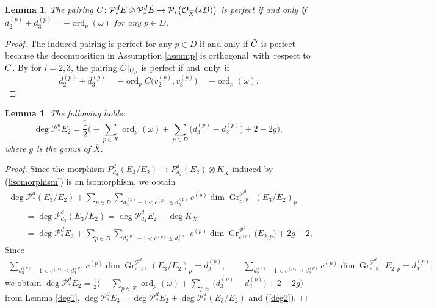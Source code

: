 \documentclass[pdftex]{sigma}
\numberwithin{equation}{section}
\newtheorem{Lemma}[Theorem]{Lemma}
\newcommand{\ord}{\operatorname{ord}}
\newcommand{\gr}{\operatorname{\mathrm{Gr}}}
\begin{document}
\begin{Lemma}\label{perfect}
 The pairing $\Tilde{C}\colon \mathcal{P}^d_* \Tilde{E}\otimes \mathcal{P}^d_* \Tilde{E}\to \mathcal{P}_*\bigl(\mathcal{O}_{\overline{X}}(*D)\bigr)$ is perfect if and only if $d^{(p)}_2 + d^{(p)}_3 = -\ord_p(\omega)$ for any $p\in D$.
\end{Lemma}
\begin{proof}
 The induced pairing  is perfect for any ${p\in D}$ if and only if $\Tilde{C}$ is perfect because the decomposition in Assumption \ref{assump} is orthogonal~with~respect to $\Tilde{C}$. By  for $i=2,3$, the pairing $\Tilde{C}|_{U_p}$ is perfect if and~only~if%
\begin{equation*}
 d^{(p)}_2 + d^{(p)}_3 = -\ord_p C\bigl(v^{(p)}_2,v^{(p)}_3\bigr) = -\ord_p(\omega).\tag*{\qed}
 \end{equation*}
 \renewcommand{\qed}{}
\end{proof}

\begin{Lemma}\label{deg_E2}
 The following holds:
 \begin{equation*}
 \deg{\mathcal{P}^d_{*}E_2} = \frac{1}{2}\biggl(-\sum_{p\in X}\ord_p(\omega) + \sum_{p\in D} \bigl(d^{(p)}_3 - d^{(p)}_2\bigr) + 2-2g\biggr),
 \end{equation*}
where $g$ is the genus of $\overline{X}$.
\end{Lemma}
\begin{proof}
 Since the morphism ${P}^d_{d_3}(E_3/E_2)\to {P}^d_{d_2}(E_2)\otimes K_{\overline{X}}$ induced by (\ref{isomorphism}) is an isomorphism, we obtain
\begin{gather}
 \deg{\mathcal{P}^d_{*}(E_3/E_2)} + \sum_{p\in D}\sum_{d^{(p)}_{3}-1< c^{(p)}\leq d^{(p)}_{3}} c^{(p)} \dim \gr^{\mathcal{P}^d}_{c^{(p)}} (E_3/E_2)_{p} \nonumber\\
 \qquad{}= \deg{\mathcal{P}^d_{d_3}(E_3/E_2)} = \deg{\mathcal{P}^d_{d_2}E_2} + \deg{K_{\overline{X}}} \nonumber\\
 \qquad{}= \deg{\mathcal{P}^d_{*}E_2} + \sum_{p\in D}\sum_{d^{(p)}_{2}-1< c^{(p)}\leq d^{(p)}_{2}} c^{(p)} \dim \gr^{\mathcal{P}^d}_{c^{(p)}} \bigl(E_{2,p}\bigr) + 2g -2,\label{deg2}
\end{gather}
 Since
\begin{gather*}
 \sum_{d^{(p)}_{3}-1< c^{(p)}\leq d^{(p)}_{3}} c^{(p)} \dim \gr^{\mathcal{P}^d}_{c^{(p)}} (E_3/E_2)_{p} = d^{(p)}_3, \qquad
 \sum_{d^{(p)}_{2}-1< c^{(p)}\leq d^{(p)}_{2}} c^{(p)} \dim \gr^{\mathcal{P}^d}_{c^{(p)}} E_{2,p} = d^{(p)}_2,
\end{gather*}
we obtain $\deg{\mathcal{P}^d_{*}E_2} = \frac{1}{2}\bigl(-\sum_{p\in X}\ord_p(\omega) + \sum_{p\in} \bigl(d^{(p)}_3 - d^{(p)}_2\bigr) + 2-2g\bigr)$ from Lemma \ref{deg1}, ${\deg{\mathcal{P}^{d}_*E_3} = \deg{\mathcal{P}^{d}_*E_2} + \deg{\mathcal{P}^{d}_*(E_3/E_2)}}$ and (\ref{deg2}).
\end{proof}
\end{document}
